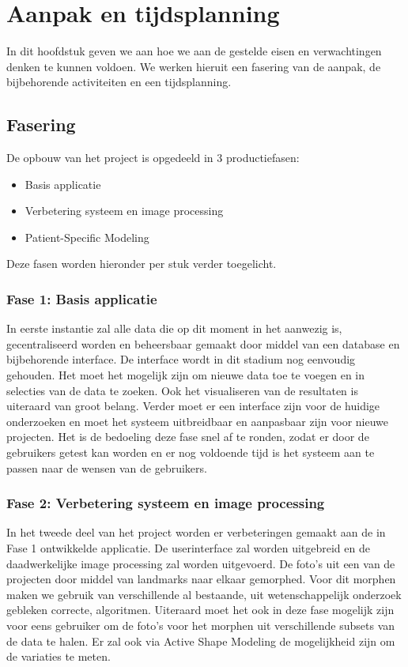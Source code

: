 \section{Aanpak en tijdsplanning}
\label{aanpak_en_tijdsplanning}

In dit hoofdstuk geven we aan hoe we aan de gestelde eisen en verwachtingen denken te kunnen voldoen. 
We werken hieruit een fasering van de aanpak, de bijbehorende activiteiten en een tijdsplanning.

\subsection{Fasering}

De opbouw van het project is opgedeeld in 3 productiefasen:
\begin{itemize}
	\item Basis applicatie
	\item Verbetering systeem en image processing
	\item Patient-Specific Modeling
\end{itemize}
Deze fasen worden hieronder per stuk verder toegelicht.

\subsubsection{Fase 1: Basis applicatie}
In eerste instantie zal alle data die op dit moment in het \casamproject aanwezig is, gecentraliseerd worden en beheersbaar gemaakt door middel van een database en bijbehorende interface. De interface wordt in dit stadium nog eenvoudig gehouden. Het moet het mogelijk zijn om nieuwe data toe te voegen en in selecties van de data te zoeken. Ook het visualiseren van de resultaten is uiteraard van groot belang. 
Verder moet er een interface zijn voor de huidige onderzoeken en moet het systeem uitbreidbaar en aanpasbaar zijn voor nieuwe projecten. Het is de bedoeling deze fase snel af te ronden, zodat er door de gebruikers getest kan worden en er nog voldoende tijd is het systeem aan te passen naar de wensen van de gebruikers.

\subsubsection{Fase 2: Verbetering systeem en image processing}
In het tweede deel van het project worden er verbeteringen gemaakt aan de in Fase 1 ontwikkelde applicatie. De userinterface zal worden uitgebreid en de daadwerkelijke image processing zal worden uitgevoerd. De foto's uit een van de projecten door middel van landmarks naar elkaar gemorphed. 
Voor dit morphen maken we gebruik van verschillende al bestaande, uit wetenschappelijk onderzoek gebleken correcte, algoritmen.
Uiteraard moet het ook in deze fase mogelijk zijn voor eens gebruiker om de foto's voor het morphen uit verschillende subsets van de data te halen.
Er zal ook via Active Shape Modeling de mogelijkheid zijn om de variaties te meten.


